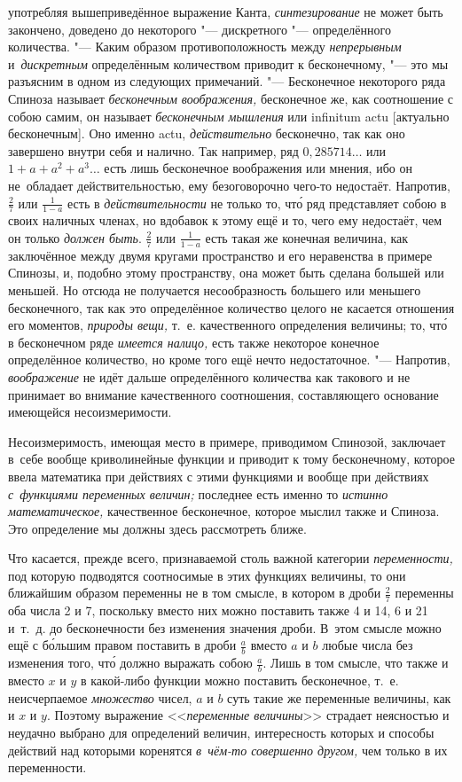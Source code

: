 употребляя вышеприведённое выражение Канта, {\em синтезирование} не может быть
закончено, доведено до некоторого "--- дискретного "--- определённого
количества. "--- Каким образом противоположность между {\em непрерывным}
и~{\em дискретным} определённым количеством приводит к бесконечному, "--- это
мы разъясним в одном из следующих примечаний. "--- Бесконечное некоторого ряда
Спиноза называет {\em бесконечным воображения,} бесконечное же, как соотношение
с собою самим, он называет {\em бесконечным мышления} или infi\-ni\-tum actu
[актуально бесконечным]. Оно именно actu, {\em действительно} бесконечно, так
как оно завершено внутри себя и налично. Так например, ряд $0{,}285714\ldots$
или $1+a+a^2+a^3\ldots$ есть лишь бесконечное воображения или мнения, ибо он
не~обладает действительностью, ему безоговорочно чего-то недостаёт. Напротив,
$\frac 2 7$ или $\frac 1{1-a}$ есть в {\em действительности} не только то, чт\'{о} ряд
представляет собою в своих наличных членах, но вдобавок к этому ещё и то, чего
ему недостаёт, чем он только {\em должен быть}. $\frac 2 7$ или $\frac 1{1-a}$
есть такая же конечная величина, как заключённое между двумя кругами
пространство и его неравенства в примере Спинозы, и, подобно этому
пространству, она может быть сделана большей или меньшей. Но отсюда не
получается несообразность большего или меньшего бесконечного, так как это
определённое количество целого не касается отношения его моментов,
{\em природы вещи,} т.~е. качественного определения величины; то, чт\'{о} в бесконечном
ряде {\em имеется налицо,} есть также некоторое конечное определённое количество,
но кроме того ещё нечто недостаточное. "--- Напротив, {\em воображение} не идёт
дальше определённого количества как такового и не принимает во внимание
качественного соотношения, составляющего основание имеющейся несоизмеримости.

Несоизмеримость, имеющая место в примере, приводимом Спинозой, заключает в~себе
вообще криволинейные функции и приводит к тому бесконечному, которое ввела
математика при действиях с этими функциями и вообще при действиях
{\em с~функциями переменных величин;} последнее есть именно то
{\em истинно математическое,} качественное бесконечное, которое мыслил
также и Спиноза. Это определение мы должны здесь рассмотреть ближе.

Что касается, прежде всего, признаваемой столь важной категории
{\em переменности,} под которую подводятся соотносимые в этих функциях
величины, то они ближайшим образом переменны не в том смысле, в котором в дроби
$\frac 2 7$ переменны оба числа 2 и 7, поскольку вместо них можно поставить
также 4 и 14, 6 и 21 и~т.~д. до бесконечности без изменения значения дроби.
В~этом смысле можно ещё с б\'{о}льшим правом поставить в дроби $\frac a b$ вместо
$a$ и $b$ любые числа без изменения того, чт\'{о} должно выражать собою
$\frac a b$. Лишь в том смысле, что также и вместо $x$ и $y$ в какой-либо
функции можно поставить бесконечное, т.~е. неисчерпаемое {\em множество} чисел,
$a$ и $b$ суть такие же переменные величины, как и $x$ и $y$. Поэтому выражение
<<{\em переменные величины}>> страдает неясностью и неудачно выбрано для
определений величин, интересность которых и способы действий над которыми
коренятся {\em в~чём-то совершенно другом,} чем только в их переменности.

